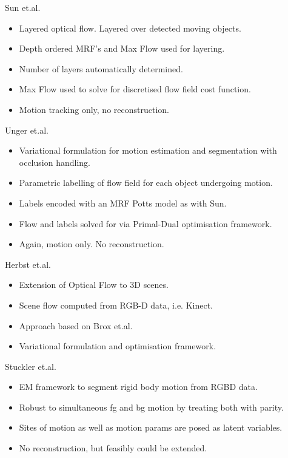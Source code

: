 Sun et.al. \cite{Sun2012}
\begin{itemize}
	\item Layered optical flow. Layered over detected moving objects.
	\item Depth ordered MRF's and Max Flow used for layering.%
	\item Number of layers automatically determined.
	\item Max Flow used to solve for discretised flow field cost function.
	\item Motion tracking only, no reconstruction.
\end{itemize}

Unger et.al. \cite{Unger2012}
\begin{itemize}
	\item Variational formulation for motion estimation and segmentation with occlusion handling.
	\item Parametric labelling of flow field for each object undergoing motion.
	\item Labels encoded with an MRF Potts model as with Sun. %
	\item Flow and labels solved for via Primal-Dual optimisation framework. %
	\item Again, motion only. No reconstruction.
\end{itemize}

Herbst et.al. \cite{Herbst2013}
\begin{itemize}
	\item Extension of Optical Flow to 3D scenes.
	\item Scene flow computed from RGB-D data, i.e. Kinect.
	\item Approach based on Brox et.al. \cite{Brox2004}
	\item Variational formulation and optimisation framework.
\end{itemize}

Stuckler et.al. \cite{Stueckler2013}
\begin{itemize}
	\item EM framework to segment rigid body motion from RGBD data.
	\item Robust to simultaneous fg and bg motion by treating both with parity.
	\item Sites of motion as well as motion params are posed as latent variables.
	\item No reconstruction, but feasibly could be extended.
\end{itemize}

